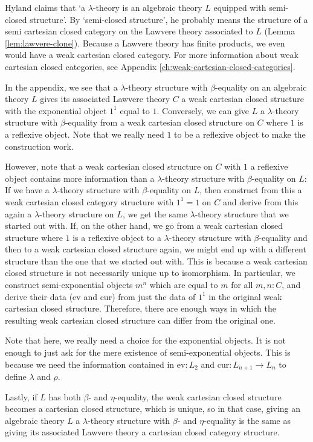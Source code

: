 \begin{remark}
  Hyland claims that `a $ \lambda $-theory is an algebraic theory $ L $ equipped with semi-closed structure'. By `semi-closed structure', he probably means the structure of a semi cartesian closed category on the Lawvere theory associated to $ L $ (Lemma \ref{lem:lawvere-clone}). Because a Lawvere theory has finite products, we even would have a weak cartesian closed category. For more information about weak cartesian closed categories, see Appendix \ref{ch:weak-cartesian-closed-categories}.

  In the appendix, we see that a $ \lambda $-theory structure with $ \beta $-equality on an algebraic theory $ L $ gives its associated Lawvere theory $ C $ a weak cartesian closed structure with the exponential object $ 1^1 $ equal to $ 1 $. Conversely, we can give $ L $ a $ \lambda $-theory structure with $ \beta $-equality from a weak cartesian closed structure on $ C $ where $ 1 $ is a reflexive object. Note that we really need $ 1 $ to be a reflexive object to make the construction work.

  However, note that a weak cartesian closed structure on $ C $ with $ 1 $ a reflexive object contains more information than a $ \lambda $-theory structure with $ \beta $-equality on $ L $: If we have a $ \lambda $-theory structure with $ \beta $-equality on $ L $, then construct from this a weak cartesian closed category structure with $ 1^1 = 1 $ on $ C $ and derive from this again a $ \lambda $-theory structure on $ L $, we get the same $ \lambda $-theory structure that we started out with. If, on the other hand, we go from a weak cartesian closed structure where $ 1 $ is a reflexive object to a $ \lambda $-theory structure with $ \beta $-equality and then to a weak cartesian closed structure again, we might end up with a different structure than the one that we started out with. This is because a weak cartesian closed structure is not necessarily unique up to isomorphism. In particular, we construct semi-exponential objects $ m^n $ which are equal to $ m $ for all $ m, n : C $, and derive their data ($ \mathrm{ev} $ and $ \mathrm{cur} $) from just the data of $ 1^1 $ in the original weak cartesian closed structure. Therefore, there are enough ways in which the resulting weak cartesian closed structure can differ from the original one.

  Note that here, we really need a choice for the exponential objects. It is not enough to just ask for the mere existence of semi-exponential objects. This is because we need the information contained in $ \mathrm{ev}: L_2 $ and $ \mathrm{cur} : L_{n + 1} \to L_n $ to define $ \lambda $ and $ \rho $.

  Lastly, if $ L $ has both $ \beta $- and $ \eta $-equality, the weak cartesian closed structure becomes a cartesian closed structure, which is unique, so in that case, giving an algebraic theory $ L $ a $ \lambda $-theory structure with $ \beta $- and $ \eta $-equality is the same as giving its associated Lawvere theory a cartesian closed category structure.
\end{remark}

